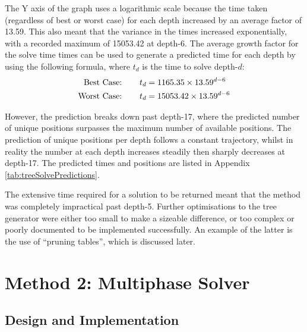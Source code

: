 \documentclass{report}
\newcommand{\depth}[1]{depth-#1}
\begin{document}
    The Y axis of the graph uses a logarithmic scale because the time taken (regardless of best or worst case) for each depth increased by an average factor of 13.59. This also meant that the variance in the times increased exponentially, with a recorded maximum of 15053.42 at \depth{6}. The average growth factor for the solve time times can be used to generate a predicted time for each depth by using the following formula, where $t_d$ is the time to solve \depth{$d$}:
   	\begin{align*}
   	\text{Best Case:}\hspace{7.5mm} 	&	t_d = 1165.35 \times 13.59^{d-6} \\
	\text{Worst Case:}\hspace{7.5mm}	&	t_d = 15053.42 \times 13.59^{d-6}
   	\end{align*}
   	
    However, the prediction breaks down past \depth{17}, where the predicted number of unique positions surpasses the maximum number of available positions. The prediction of unique positions per depth follows a constant trajectory, whilst in reality the number at each depth increases steadily then sharply decreases at \depth{17}. The predicted times and positions are listed in Appendix \ref{tab:treeSolvePredictions}.
    
    The extensive time required for a solution to be returned meant that the method was completely impractical past \depth{5}. Further optimisations to the tree generator were either too small to make a sizeable difference, or too complex or poorly documented to be implemented successfully. An example of the latter is the use of \enquote{pruning tables}, which is discussed later.
    
	\section{Method 2: Multiphase Solver}
	
	\subsection{Design and Implementation}
	
\end{document}
